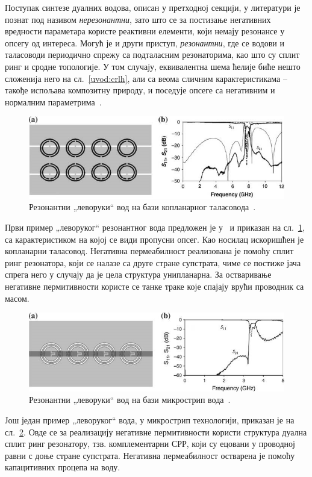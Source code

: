 \documentclass[main.tex]{subfiles}
\begin{document}
Поступак синтезе дуалних водова, описан у претходној секцији, у литератури је познат под називом \emph{нерезонантни}, зато што се за постизање негативних вредности параметара користе реактивни елементи, који немају резонансе у опсегу од интереса. Могућ је и други приступ, \emph{резонантни}, где се водови и таласоводи периодично спрежу са подталасним резонаторима, као што су сплит ринг и сродне топологије. У том случају, еквивалентна шема ћелије биће нешто сложенија него на сл.~\ref{uvod:crlh}, али са веома сличним карактеристикама – такође испољава композитну природу, и поседује опсеге са негативним и нормалним параметрима~\cite{markes_knjiga}.

\begin{figure}[h]
    \centering
    \includegraphics[width=1.0\linewidth]{sl_uvod/cpw.jpg}
    \caption{Резонантни „леворуки`` вод на бази копланарног таласовода~\cite{doi:10.1063/1.1631392}.}
    \label{uvod:sl_cpw}
\end{figure}
Први пример „леворуког`` резонантног вода предложен је у~\cite{doi:10.1063/1.1631392} и приказан на сл.~\ref{uvod:sl_cpw}, са карактеристиком на којој се види пропусни опсег. Као носилац искоришћен је копланарни таласовод. Негативна пермеабилност реализована је помоћу сплит ринг резонатора, који се налазе са друге стране супстрата, чиме се постиже јача спрега него у случају да је цела структура унипланарна. За остваривање негативне пермитивности користе се танке траке које спајају врући проводник са масом.


\begin{figure}[h]
    \centering
    \includegraphics[width=1.0\linewidth]{sl_uvod/mstrip_csrr.jpg}
    \caption{Резонантни „леворуки`` вод на бази микрострип вода~\cite{baena}.}
    \label{uvod:sl_mstrip_csrr}
\end{figure}
Још један пример „леворуког`` вода, у микрострип технологији, приказан је на сл.~\ref{uvod:sl_mstrip_csrr}. Овде се за реализацију негативне пермитивности користи структура дуална сплит ринг резонатору, тзв. комплементарни СРР, који су ецовани у проводној равни с доње стране супстрата. Негативна пермеабилност остварена је помоћу капацитивних процепа на воду.
\end{document}
